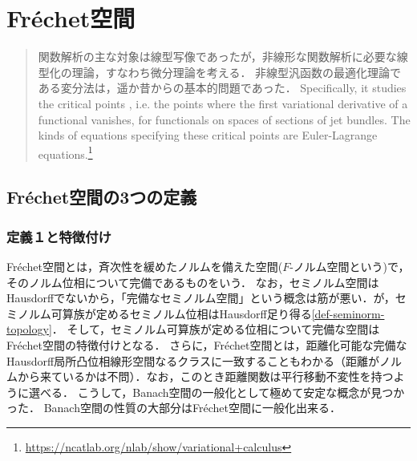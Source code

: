 \documentclass[uplatex,dvipdfmx]{jsreport}
\begin{document}
\chapter{Fréchet空間}

\begin{quotation}
    関数解析の主な対象は線型写像であったが，非線形な関数解析に必要な線型化の理論，すなわち微分理論を考える．
    非線型汎函数の最適化理論である変分法は，遥か昔からの基本的問題であった．
    Specifically, it studies the critical points , i.e. the points where the first variational derivative of a functional vanishes, for functionals on spaces of sections of jet bundles. The kinds of equations specifying these critical points are Euler-Lagrange equations.\footnote{\url{https://ncatlab.org/nlab/show/variational+calculus}}
\end{quotation}

\section{Fréchet空間の3つの定義}

\subsection{定義１と特徴付け}

\begin{tcolorbox}[colframe=ForestGreen, colback=ForestGreen!10!white,breakable,colbacktitle=ForestGreen!40!white,coltitle=black,fonttitle=\bfseries\sffamily,
title=局所凸な$F$-空間]
    Fréchet空間とは，斉次性を緩めたノルムを備えた空間($F$-ノルム空間という)で，そのノルム位相について完備であるものをいう．
    なお，セミノルム空間はHausdorffでないから，「完備なセミノルム空間」という概念は筋が悪い．が，セミノルム可算族が定めるセミノルム位相はHausdorff足り得る\ref{def-seminorm-topology}．
    そして，セミノルム可算族が定める位相について完備な空間はFréchet空間の特徴付けとなる．
    さらに，Fréchet空間とは，距離化可能な完備なHausdorff局所凸位相線形空間なるクラスに一致することもわかる（距離がノルムから来ているかは不問）．なお，このとき距離関数は平行移動不変性を持つように選べる．
    こうして，Banach空間の一般化として極めて安定な概念が見つかった．
    Banach空間の性質の大部分はFréchet空間に一般化出来る．
\end{tcolorbox}
\end{document}
